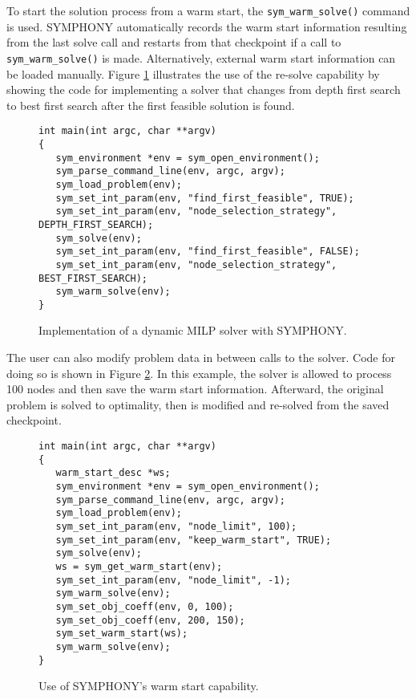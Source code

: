 To start the solution process from a warm start, the \texttt{sym\_warm\_solve()}
command is used. SYMPHONY automatically records the warm start information
resulting from the last solve call and restarts from that checkpoint if a call
to \texttt{sym\_warm\_solve()} is made. Alternatively, external warm start
information can be loaded manually. Figure \ref{dynamic} illustrates the use
of the re-solve capability by showing the code for implementing a solver that
changes from depth first search to best first search after the first feasible
solution is found.
\begin{figure}[tb]
\begin{Verbatim}[frame=lines]
int main(int argc, char **argv)
{
   sym_environment *env = sym_open_environment();
   sym_parse_command_line(env, argc, argv);
   sym_load_problem(env);
   sym_set_int_param(env, "find_first_feasible", TRUE);
   sym_set_int_param(env, "node_selection_strategy", DEPTH_FIRST_SEARCH);
   sym_solve(env);
   sym_set_int_param(env, "find_first_feasible", FALSE);
   sym_set_int_param(env, "node_selection_strategy", BEST_FIRST_SEARCH);
   sym_warm_solve(env);
}
\end{Verbatim}
\caption{Implementation of a dynamic MILP solver with SYMPHONY. 
\label{dynamic}}
\end{figure}
The user can also modify problem data in between calls to the solver. Code for
doing so is shown in Figure \ref{warm_start}. In this example, the
solver is allowed to process 100 nodes and then save the warm start
information. Afterward, the original problem is solved to optimality, then is
modified and re-solved from the saved checkpoint. 
\begin{figure}[tb]
\begin{Verbatim}[frame=lines]
int main(int argc, char **argv)
{
   warm_start_desc *ws;
   sym_environment *env = sym_open_environment();
   sym_parse_command_line(env, argc, argv);
   sym_load_problem(env);
   sym_set_int_param(env, "node_limit", 100);
   sym_set_int_param(env, "keep_warm_start", TRUE);
   sym_solve(env);
   ws = sym_get_warm_start(env);
   sym_set_int_param(env, "node_limit", -1);
   sym_warm_solve(env);
   sym_set_obj_coeff(env, 0, 100);
   sym_set_obj_coeff(env, 200, 150);
   sym_set_warm_start(ws);
   sym_warm_solve(env);
}
\end{Verbatim}
\caption{Use of SYMPHONY's warm start capability. \label{warm_start}}
\end{figure}

